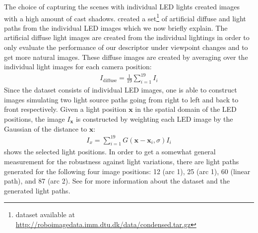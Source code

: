 \documentclass[thesis.tex]{subfiles}
\begin{document}
The choice of capturing the scenes with individual LED lights created images with a high amount of cast shadows. \citet{larsen2012jet} created a set\footnote{dataset available at \url{http://roboimagedata.imm.dtu.dk/data/condensed.tar.gz}} of artificial diffuse and light paths from the individual LED images which we now briefly explain. The artificial diffuse light images are created from the individual lightings in order to only evaluate the performance of our descriptor under viewpoint changes and to get more natural images. These diffuse images are created by averaging over the individual light images for each camera position:
\begin{align}
	I_{\text{diffuse}} = \frac{1}{19} \sum_{i = 1}^{19} I_{i}
\end{align}
Since the dataset consists of individual LED images, one is able to construct images simulating two light source paths going from right to left and back to front respectively.
Given a light position ${\boldsymbol{x}}$ in the spatial domain of the LED positions, the image $I_{\boldsymbol{x}}$ is constructed by weighting each LED image by the Gaussian of the distance to ${\boldsymbol{x}}$:
\begin{align}
	I_{x} = \sum_{i = 1}^{19} G(\boldsymbol{x} - \boldsymbol{x}_i,\sigma) I_{i}
\end{align}
 shows the selected light positions. In order to get a somewhat general measurement for the robustness against light variations, there are light paths generated for the following four image positions: 12 (arc 1), 25 (arc 1), 60 (linear path), and 87 (arc 2). 
See \citet{aanaes2010recall,aanaes2010ground,larsen2012jet} for more information about the dataset and the generated light paths.
\end{document}
